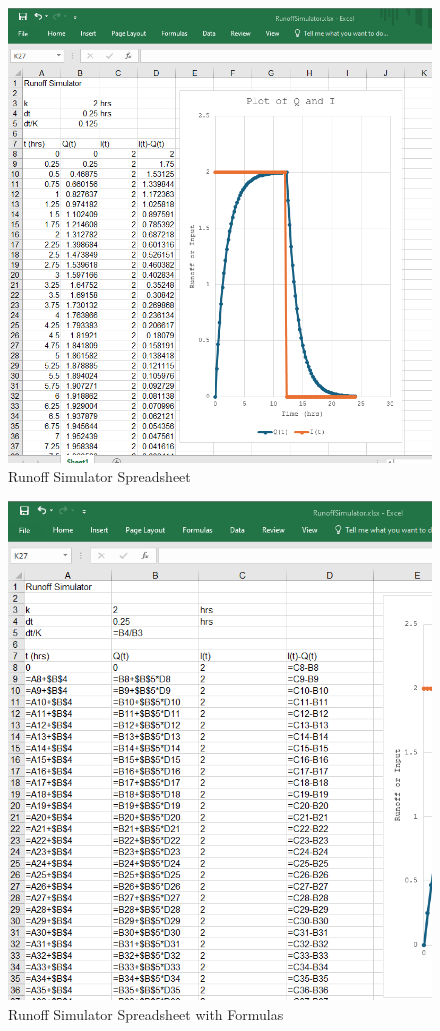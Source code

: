 \documentclass[12pt]{article}
\begin{document}
\begin{enumerate}
\begin{figure}[h!] %
   \centering
   \includegraphics[width=6in]{ES1-P4-XLS.png} 
   \caption{Runoff Simulator Spreadsheet}
   \label{fig:ES1-P4-XLS}
\end{figure}

\begin{figure}[h!] %
   \centering
   \includegraphics[width=6in]{ES1-P4-FORM.png} 
   \caption{Runoff Simulator Spreadsheet with Formulas}
   \label{fig:ES1-P4-FORM}
\end{figure}
    
\end{enumerate}
\end{document}
